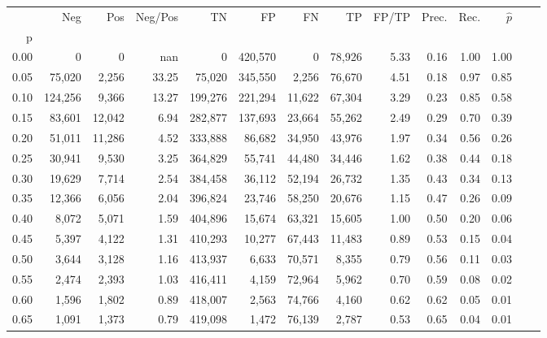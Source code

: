 \begin{tabular}{rrrrrrrrrrrrrr}
\toprule
{} &      Neg &     Pos & Neg/Pos &       TN &       FP &      FN &      TP & FP/TP & Prec. &  Rec. & $\hat{p}$ \\
p    &          &         &         &          &          &         &         &       &       &       &           \\
\midrule
0.00 &        0 &       0 &     nan &        0 &  420,570 &       0 &  78,926 &  5.33 &  0.16 &  1.00 &      1.00 \\
0.05 &   75,020 &   2,256 &   33.25 &   75,020 &  345,550 &   2,256 &  76,670 &  4.51 &  0.18 &  0.97 &      0.85 \\
0.10 &  124,256 &   9,366 &   13.27 &  199,276 &  221,294 &  11,622 &  67,304 &  3.29 &  0.23 &  0.85 &      0.58 \\
0.15 &   83,601 &  12,042 &    6.94 &  282,877 &  137,693 &  23,664 &  55,262 &  2.49 &  0.29 &  0.70 &      0.39 \\
0.20 &   51,011 &  11,286 &    4.52 &  333,888 &   86,682 &  34,950 &  43,976 &  1.97 &  0.34 &  0.56 &      0.26 \\
0.25 &   30,941 &   9,530 &    3.25 &  364,829 &   55,741 &  44,480 &  34,446 &  1.62 &  0.38 &  0.44 &      0.18 \\
0.30 &   19,629 &   7,714 &    2.54 &  384,458 &   36,112 &  52,194 &  26,732 &  1.35 &  0.43 &  0.34 &      0.13 \\
0.35 &   12,366 &   6,056 &    2.04 &  396,824 &   23,746 &  58,250 &  20,676 &  1.15 &  0.47 &  0.26 &      0.09 \\
0.40 &    8,072 &   5,071 &    1.59 &  404,896 &   15,674 &  63,321 &  15,605 &  1.00 &  0.50 &  0.20 &      0.06 \\
0.45 &    5,397 &   4,122 &    1.31 &  410,293 &   10,277 &  67,443 &  11,483 &  0.89 &  0.53 &  0.15 &      0.04 \\
0.50 &    3,644 &   3,128 &    1.16 &  413,937 &    6,633 &  70,571 &   8,355 &  0.79 &  0.56 &  0.11 &      0.03 \\
0.55 &    2,474 &   2,393 &    1.03 &  416,411 &    4,159 &  72,964 &   5,962 &  0.70 &  0.59 &  0.08 &      0.02 \\
0.60 &    1,596 &   1,802 &    0.89 &  418,007 &    2,563 &  74,766 &   4,160 &  0.62 &  0.62 &  0.05 &      0.01 \\
0.65 &    1,091 &   1,373 &    0.79 &  419,098 &    1,472 &  76,139 &   2,787 &  0.53 &  0.65 &  0.04 &      0.01 \\

\end{tabular}
